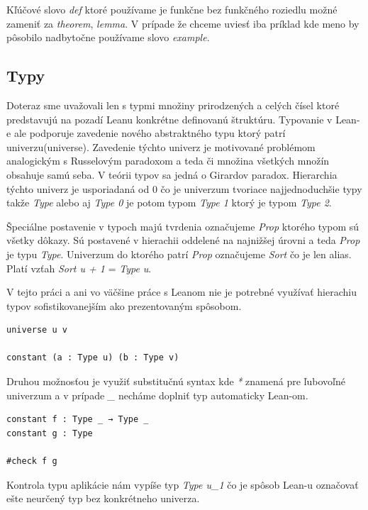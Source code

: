 \documentclass[a4paper,10pt,oneside]{report}%
\begin{document}
    Kľúčové slovo \emph{def} ktoré používame je funkčne bez funkčného roziedlu možné
zameniť za \emph{theorem}, \emph{lemma}. V prípade že chceme uviesť iba príklad
kde meno by pôsobilo nadbytočne používame slovo \emph{example}.

\subsection{Typy}
    Doteraz sme uvažovali len s typmi množiny prirodzených a celých čísel
ktoré predstavujú na pozadí Leanu konkrétne definovanú štruktúru.
    Typovanie v Lean-e ale podporuje zavedenie nového abstraktného typu ktorý patrí univerzu(universe).
    Zavedenie týchto univerz je motivované problémom analogickým s Russelovým paradoxom
a teda či množina všetkých množín obsahuje samú seba.
    V teórii typov sa jedná o Girardov paradox.
    Hierarchia týchto univerz je usporiadaná od 0 čo je univerzum tvoriace najjednoduchšie
typy takže \emph{Type} alebo aj \emph{Type 0} je potom typom \emph{Type 1} ktorý
je typom \emph{Type 2}.

    Špeciálne postavenie v typoch majú tvrdenia označujeme \emph{Prop} ktorého
typom sú všetky dôkazy.
    Sú postavené v hierachii oddelené na najnižšej úrovni a teda \emph{Prop} je 
typu \emph{Type}.
    Univerzum do ktorého patrí \emph{Prop} označujeme \emph{Sort} čo je len 
alias.
Platí vzťah \emph{Sort u + 1} = \emph{Type u}.

V tejto práci a ani vo väčšine práce s Leanom nie je potrebné využívať hierachiu
    typov sofistikovanejším ako prezentovaným spôsobom.
\begin{lstlisting}
universe u v

constant (a : Type u) (b : Type v)
\end{lstlisting}
Druhou možnosťou je využiť substitučnú syntax kde \emph{*} znamená pre ľubovoľné univerzum
a v prípade \emph{\_} necháme doplniť typ automaticky Lean-om.
\begin{lstlisting}
constant f : Type _ → Type _
constant g : Type

#check f g
\end{lstlisting}
    Kontrola typu aplikácie nám vypíše typ \emph{Type u\_1} čo je spôsob Lean-u označovať
ešte neurčený typ bez konkrétneho univerza.
\end{document}
